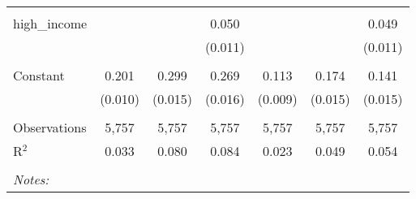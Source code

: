 \begin{table}[!htbp]
\begin{tabular}{@{\extracolsep{5pt}}lcccccc}
  & & & & & & \\ 
 high\_income &  &  & 0.050 &  &  & 0.049 \\ 
  &  &  & (0.011) &  &  & (0.011) \\ 
  & & & & & & \\ 
 Constant & 0.201 & 0.299 & 0.269 & 0.113 & 0.174 & 0.141 \\ 
  & (0.010) & (0.015) & (0.016) & (0.009) & (0.015) & (0.015) \\ 
  & & & & & & \\ 
Observations & 5,757 & 5,757 & 5,757 & 5,757 & 5,757 & 5,757 \\ 
R$^{2}$ & 0.033 & 0.080 & 0.084 & 0.023 & 0.049 & 0.054 \\ 
\hline \\[-1.8ex] 
\textit{Notes:} & \multicolumn{6}{l}{} \\ 
\end{tabular} 
\end{table} 
